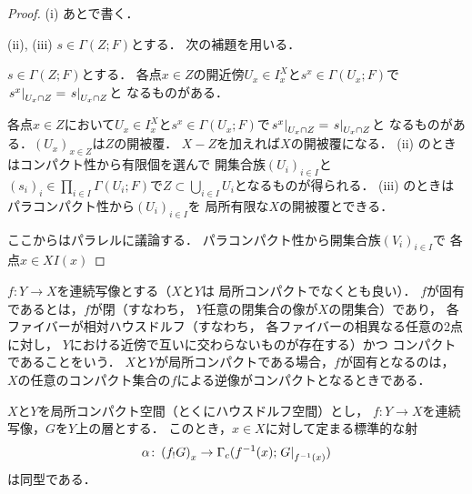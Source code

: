 \begin{proof}
    (i) あとで書く．

    (ii), (iii) 
    \(s\in\Gamma(Z;F)\)とする．
    次の補題を用いる．
    \begin{leftbar}
    \begin{LMM*}
        \(s\in\Gamma(Z;F)\)とする．
        各点\(x\in Z\)の開近傍\(U_x\in I_x^X\)と\(
            s^x\in\Gamma(U_x;F)
        \)で\(\mres[s^x]{U_x\cap Z}=\mres[s]{U_x\cap Z}\)と
        なるものがある．
    \end{LMM*}
    \end{leftbar}
    各点\(x\in Z\)において\(U_x\in I_x^X\)と\(
        s^x\in\Gamma(U_x;F)
    \)で\(\mres[s^x]{U_x\cap Z}=\mres[s]{U_x\cap Z}\)と
    なるものがある．\((U_x)_{x\in Z}\)は\(Z\)の開被覆．
    \(X-Z\)を加えれば\(X\)の開被覆になる．
    (ii) のときはコンパクト性から有限個を選んで
    開集合族\((U_i)_{i\in I}\)と\(
        (s_i)_i\in\prod_{i\in I}\Gamma(U_i;F)
    \)で\(Z\subset \bigcup_{i\in I}U_i\)となるものが得られる．
    (iii) のときはパラコンパクト性から\((U_i)_{i\in I}\)を
    局所有限な\(X\)の開被覆とできる．

    ここからはパラレルに議論する．
    パラコンパクト性から開集合族\((V_i)_{i\in I}\)で
    各点\(x\in X\)\(I(x)\)
\end{proof}
\(f\colon Y\to X\)を連続写像とする（\(X\)と\(Y\)は
局所コンパクトでなくとも良い）．
\(f\)が固有であるとは，\(f\)が閉（すなわち，
\(Y\)任意の閉集合の像が\(X\)の閉集合）であり，
各ファイバーが相対ハウスドルフ（すなわち，
各ファイバーの相異なる任意の2点に対し，
\(Y\)における近傍で互いに交わらないものが存在する）かつ
コンパクトであることをいう．
\(X\)と\(Y\)が局所コンパクトである場合，\(f\)が固有となるのは，
\(X\)の任意のコンパクト集合の\(f\)による逆像がコンパクトとなるときである．

\begin{PRP}\label{prp252}
    \(X\)と\(Y\)を局所コンパクト空間（とくにハウスドルフ空間）とし，
    \(f\colon Y\to X\)を連続写像，\(G\)を\(Y\)上の層とする．
    このとき，\(x\in X\)に対して定まる標準的な射
    \[
        \alpha\colon \left(f_{!}G\right)_x
        \to
        \Gamma_{c}(f^{-1}(x);\mres[G]{f^{-1}(x)})
    \]
    は同型である．
\end{PRP}

